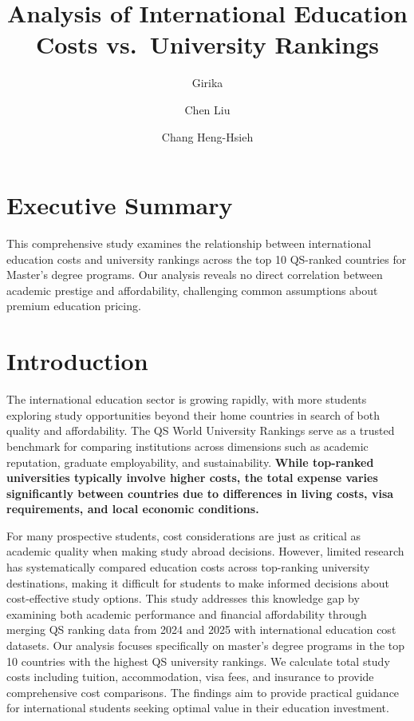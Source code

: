 \documentclass[
  letterpaper,
  DIV=11,
  numbers=noendperiod]{scrartcl}
\title{Analysis of International Education Costs vs.~University
Rankings}
\author{Girika \and Chen Liu \and Chang Heng-Hsieh}
\date{}
\renewcommand*\contentsname{Table of contents}
\newcommand\contentsname{Table of contents}
\begin{document}
\maketitle

\renewcommand*\contentsname{Table of contents}
{
\hypersetup{linkcolor=}
\setcounter{tocdepth}{2}
\tableofcontents
}

\section{Executive Summary}\label{executive-summary}

This comprehensive study examines the relationship between international
education costs and university rankings across the top 10 QS-ranked
countries for Master's degree programs. Our analysis reveals no direct
correlation between academic prestige and affordability, challenging
common assumptions about premium education pricing.

\section{Introduction}\label{introduction}

The international education sector is growing rapidly, with more
students exploring study opportunities beyond their home countries in
search of both quality and affordability. The QS World University
Rankings serve as a trusted benchmark for comparing institutions across
dimensions such as academic reputation, graduate employability, and
sustainability. \textbf{While top-ranked universities typically involve
higher costs, the total expense varies significantly between countries
due to differences in living costs, visa requirements, and local
economic conditions.}

For many prospective students, cost considerations are just as critical
as academic quality when making study abroad decisions. However, limited
research has systematically compared education costs across top-ranking
university destinations, making it difficult for students to make
informed decisions about cost-effective study options. This study
addresses this knowledge gap by examining both academic performance and
financial affordability through merging QS ranking data from 2024 and
2025 with international education cost datasets. Our analysis focuses
specifically on master's degree programs in the top 10 countries with
the highest QS university rankings. We calculate total study costs
including tuition, accommodation, visa fees, and insurance to provide
comprehensive cost comparisons. The findings aim to provide practical
guidance for international students seeking optimal value in their
education investment.
\end{document}
